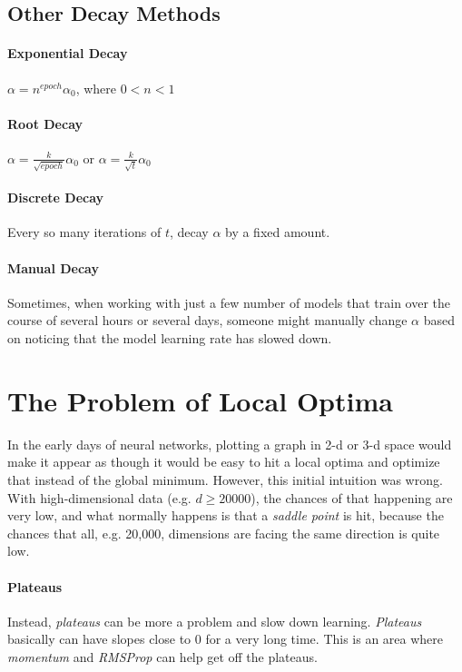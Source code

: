 \documentclass{article}
\begin{document}
\subsection{Other Decay Methods}

\paragraph{Exponential Decay}

$\alpha = n^{epoch} \alpha_0$, where $0 < n < 1$

\paragraph{Root Decay}

$\alpha = \frac{k}{\sqrt{epoch}} \alpha_0$ or $\alpha = \frac{k}{\sqrt{t}} \alpha_0$

\paragraph{Discrete Decay}

Every so many iterations of $t$, decay $\alpha$ by a fixed amount.

\paragraph{Manual Decay}

Sometimes, when working with just a few number of models that train over the course of several hours or several days, someone might manually change $\alpha$ based on noticing that the model learning rate has slowed down.

\section{The Problem of Local Optima}

In the early days of neural networks, plotting a graph in 2-d or 3-d space would make it appear as though it would be easy to hit a local optima and optimize that instead of the global minimum.  However, this initial intuition was wrong.  With high-dimensional data (e.g. $d \geq 20000$), the chances of that happening are very low, and what normally happens is that a \textit{saddle point} is hit, because the chances that all, e.g. 20,000, dimensions are facing the same direction is quite low.

\paragraph{Plateaus}

Instead, \textit{plateaus} can be more a problem and slow down learning.  \textit{Plateaus} basically can have slopes close to 0 for a very long time.  This is an area where \textit{momentum} and \textit{RMSProp} can help get off the plateaus.
\end{document}
